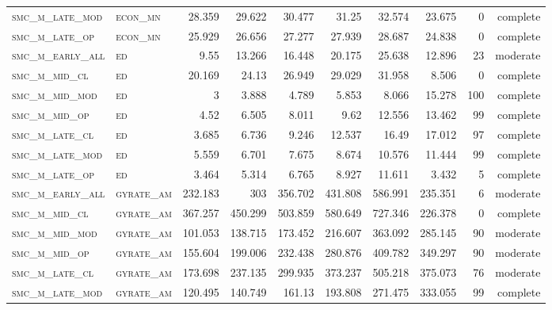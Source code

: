 \begin{landscape}
\begin{center}
\begin{footnotesize}
\begin{longtable}{llrrrrr|rrr}
\textsc{smc\_m\_late\_mod } & \textsc{econ\_mn  }   & 28.359   & 29.622   & 30.477   & 31.25    & 32.574   & 23.675   & 0   & complete \\
\textsc{smc\_m\_late\_op  } & \textsc{econ\_mn  }   & 25.929   & 26.656   & 27.277   & 27.939   & 28.687   & 24.838   & 0   & complete \\
\textsc{smc\_m\_early\_all} & \textsc{ed        }   & 9.55     & 13.266   & 16.448   & 20.175   & 25.638   & 12.896   & 23  & moderate \\
\textsc{smc\_m\_mid\_cl   } & \textsc{ed        }   & 20.169   & 24.13    & 26.949   & 29.029   & 31.958   & 8.506    & 0   & complete \\
\textsc{smc\_m\_mid\_mod  } & \textsc{ed        }   & 3        & 3.888    & 4.789    & 5.853    & 8.066    & 15.278   & 100 & complete \\
\textsc{smc\_m\_mid\_op   } & \textsc{ed        }   & 4.52     & 6.505    & 8.011    & 9.62     & 12.556   & 13.462   & 99  & complete \\
\textsc{smc\_m\_late\_cl  } & \textsc{ed        }   & 3.685    & 6.736    & 9.246    & 12.537   & 16.49    & 17.012   & 97  & complete \\
\textsc{smc\_m\_late\_mod } & \textsc{ed        }   & 5.559    & 6.701    & 7.675    & 8.674    & 10.576   & 11.444   & 99  & complete \\
\textsc{smc\_m\_late\_op  } & \textsc{ed        }   & 3.464    & 5.314    & 6.765    & 8.927    & 11.611   & 3.432    & 5   & complete \\
\textsc{smc\_m\_early\_all} & \textsc{gyrate\_am}   & 232.183  & 303      & 356.702  & 431.808  & 586.991  & 235.351  & 6   & moderate \\
\textsc{smc\_m\_mid\_cl   } & \textsc{gyrate\_am}   & 367.257  & 450.299  & 503.859  & 580.649  & 727.346  & 226.378  & 0   & complete \\
\textsc{smc\_m\_mid\_mod  } & \textsc{gyrate\_am}   & 101.053  & 138.715  & 173.452  & 216.607  & 363.092  & 285.145  & 90  & moderate \\
\textsc{smc\_m\_mid\_op   } & \textsc{gyrate\_am}   & 155.604  & 199.006  & 232.438  & 280.876  & 409.782  & 349.297  & 90  & moderate \\
\textsc{smc\_m\_late\_cl  } & \textsc{gyrate\_am}   & 173.698  & 237.135  & 299.935  & 373.237  & 505.218  & 375.073  & 76  & moderate \\
\textsc{smc\_m\_late\_mod } & \textsc{gyrate\_am}   & 120.495  & 140.749  & 161.13   & 193.808  & 271.475  & 333.055  & 99  & complete \\

\end{longtable}
\end{footnotesize}
\end{center}
\end{landscape}
